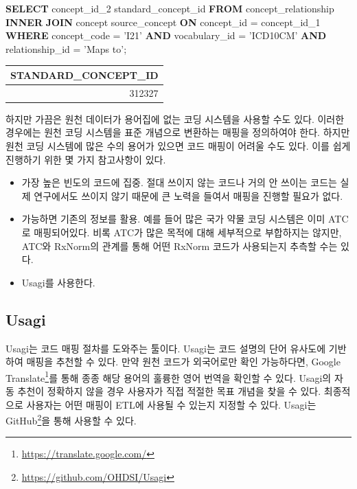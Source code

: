 \documentclass[10.5pt]{book}
\newenvironment{Shaded}{\begin{snugshade}}{\end{snugshade}}
\newcommand{\KeywordTok}[1]{\textcolor[rgb]{0.13,0.29,0.53}{\textbf{#1}}}
\newcommand{\DecValTok}[1]{\textcolor[rgb]{0.00,0.00,0.81}{#1}}
\newcommand{\StringTok}[1]{\textcolor[rgb]{0.31,0.60,0.02}{#1}}
\newcommand{\NormalTok}[1]{#1}
\providecommand{\tightlist}{%
  \setlength{\itemsep}{0pt}\setlength{\parskip}{0pt}}
\let\rmarkdownfootnote\footnote%
\def\footnote{\protect\rmarkdownfootnote}
\theoremstyle{definition}
\theoremstyle{definition}
\theoremstyle{definition}
\theoremstyle{remark}
\begin{document}
\begin{Shaded}
\begin{Highlighting}[]
\KeywordTok{SELECT}\NormalTok{ concept_id_2 standard_concept_id}
\KeywordTok{FROM}\NormalTok{ concept_relationship}
\KeywordTok{INNER} \KeywordTok{JOIN}\NormalTok{ concept source_concept}
  \KeywordTok{ON}\NormalTok{ concept_id = concept_id_}\DecValTok{1}
\KeywordTok{WHERE}\NormalTok{ concept_code = }\StringTok{'I21'}
  \KeywordTok{AND}\NormalTok{ vocabulary_id = }\StringTok{'ICD10CM'}
  \KeywordTok{AND}\NormalTok{ relationship_id = }\StringTok{'Maps to'}\NormalTok{;}
\end{Highlighting}
\end{Shaded}

\begin{longtable}[]{@{}r@{}}
\toprule
STANDARD\_CONCEPT\_ID\tabularnewline
\midrule
\endhead
312327\tabularnewline
\bottomrule
\end{longtable}

하지만 가끔은 원천 데이터가 용어집에 없는 코딩 시스템을 사용할 수도
있다. 이러한 경우에는 원천 코딩 시스템을 표준 개념으로 변환하는 매핑을
정의하여야 한다. 하지만 원천 코딩 시스템에 많은 수의 용어가 있으면 코드
매핑이 어려울 수도 있다. 이를 쉽게 진행하기 위한 몇 가지 참고사항이
있다.

\begin{itemize}
\tightlist
\item
  가장 높은 빈도의 코드에 집중. 절대 쓰이지 않는 코드나 거의 안 쓰이는
  코드는 실제 연구에서도 쓰이지 않기 때문에 큰 노력을 들여서 매핑을
  진행할 필요가 없다.
\item
  가능하면 기존의 정보를 활용. 예를 들어 많은 국가 약물 코딩 시스템은
  이미 ATC로 매핑되어있다. 비록 ATC가 많은 목적에 대해 세부적으로
  부합하지는 않지만, ATC와 RxNorm의 관계를 통해 어떤 RxNorm 코드가
  사용되는지 추측할 수는 있다.
\item
  Usagi를 사용한다.
\end{itemize}

\subsection{Usagi}\label{usagi}

Usagi는 코드 매핑 절차를 도와주는 툴이다. Usagi는 코드 설명의 단어
유사도에 기반하여 매핑을 추천할 수 있다. 만약 원천 코드가 외국어로만
확인 가능하다면, Google Translate\footnote{\url{https://translate.google.com/}}를
통해 종종 해당 용어의 훌륭한 영어 번역을 확인할 수 있다. Usagi의 자동
추천이 정확하지 않을 경우 사용자가 직접 적절한 목표 개념을 찾을 수 있다.
최종적으로 사용자는 어떤 매핑이 ETL에 사용될 수 있는지 지정할 수 있다.
Usagi는 GitHub\footnote{\url{https://github.com/OHDSI/Usagi}}을 통해
사용할 수 있다.  
\end{document}
